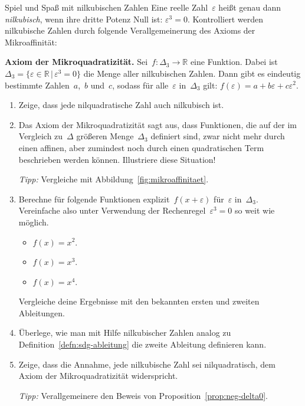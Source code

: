 \documentclass[twoside]{../zirkelblatt}
\newcommand{\RR}{\mathbb{R}}
\theoremstyle{definition}
\theoremstyle{plain}
\theoremstyle{remark}
\begin{document}
\begin{aufgabeShaded}{Spiel und Spaß mit nilkubischen Zahlen}
\label{aufg:nilkubisch}
Eine reelle Zahl~$\varepsilon$ heißt genau dann \emph{nilkubisch}, wenn ihre dritte Potenz
Null ist: $\varepsilon^3 = 0$. Kontrolliert werden nilkubische Zahlen durch
folgende Verallgemeinerung des Axioms der Mikroaffinität:

\textbf{Axiom der Mikroquadratizität.} Sei~$f : \Delta_3 \to \RR$ eine
Funktion. Dabei ist~$\Delta_3 = \{ \varepsilon \in \RR \,|\, \varepsilon^3 = 0
\}$ die Menge aller nilkubischen Zahlen. Dann gibt es eindeutig bestimmte
Zahlen~$a$,~$b$ und~$c$, sodass für alle~$\varepsilon$ in~$\Delta_3$ gilt:
$f(\varepsilon) = a + b\varepsilon + c\varepsilon^2$.

\begin{enumerate}
\item Zeige, dass jede nilquadratische Zahl auch nilkubisch ist.
\item Das Axiom der Mikroquadratizität sagt aus, dass Funktionen, die auf
der im Vergleich zu~$\Delta$ größeren Menge~$\Delta_3$ definiert sind, zwar nicht mehr durch einen
affinen, aber zumindest noch durch einen quadratischen Term beschrieben werden
können. Illustriere diese Situation!

\emph{Tipp:} Vergleiche mit Abbildung~\ref{fig:mikroaffinitaet}.
\item Berechne für folgende Funktionen explizit~$f(x+\varepsilon)$
für~$\varepsilon$ in~$\Delta_3$. Vereinfache
also unter Verwendung der Rechenregel~$\varepsilon^3 = 0$ so weit wie möglich.
\begin{itemize}
\item $f(x) = x^2$.
\item $f(x) = x^3$.
\item $f(x) = x^4$.
\end{itemize}
Vergleiche deine Ergebnisse mit den bekannten ersten und zweiten Ableitungen.
\item Überlege, wie man mit Hilfe nilkubischer Zahlen analog zu
Definition~\ref{defn:sdg-ableitung} die zweite Ableitung definieren kann.
\item Zeige, dass die Annahme, jede nilkubische Zahl sei nilquadratisch, dem
Axiom der Mikroquadratizität widerspricht.

\emph{Tipp:} Verallgemeinere den Beweis von Proposition~\ref{prop:neg-delta0}.
\end{enumerate}
\end{aufgabeShaded}
\end{document}

